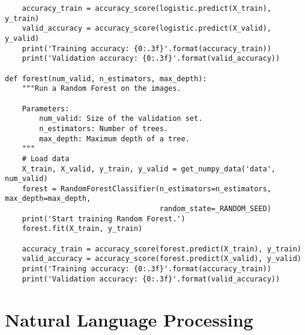 \begin{lstlisting}
    accuracy_train = accuracy_score(logistic.predict(X_train), y_train)
    valid_accuracy = accuracy_score(logistic.predict(X_valid), y_valid)
    print('Training accuracy: {0:.3f}'.format(accuracy_train))
    print('Validation accuracy: {0:.3f}'.format(valid_accuracy))

def forest(num_valid, n_estimators, max_depth):
    """Run a Random Forest on the images.

    Parameters:
        num_valid: Size of the validation set.
        n_estimators: Number of trees.
        max_depth: Maximum depth of a tree.
    """
    # Load data
    X_train, X_valid, y_train, y_valid = get_numpy_data('data', num_valid)
    forest = RandomForestClassifier(n_estimators=n_estimators, max_depth=max_depth, 
                                    random_state=_RANDOM_SEED)
    print('Start training Random Forest.')
    forest.fit(X_train, y_train)

    accuracy_train = accuracy_score(forest.predict(X_train), y_train)
    valid_accuracy = accuracy_score(forest.predict(X_valid), y_valid)
    print('Training accuracy: {0:.3f}'.format(accuracy_train))
    print('Validation accuracy: {0:.3f}'.format(valid_accuracy))
\end{lstlisting}

\newpage
\section{Natural Language Processing}

